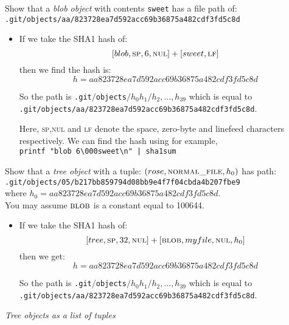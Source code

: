 \begin{example}
Show that a \textit{blob object} with contents \lstinline{sweet} has a file path of:\\
\lstinline{.git/objects/aa/823728ea7d592acc69b36875a482cdf3fd5c8d}

\begin{itemize}
\item
If we take the SHA1 hash of:
$$[blob,\textsc{sp},6,\textsc{nul}] + [sweet,\textsc{lf}]$$
then we find the hash is:
$$h = aa823728ea7d592acc69b36875a482cdf3fd5c8d$$


So the path is \lstinline{.git}$/$\lstinline{objects}$/h_0h_1/h_2,...,h_{39}$
which is equal to \lstinline{.git/objects/aa/823728ea7d592acc69b36875a482cdf3fd5c8d}.

Here, \textsc{sp},\textsc{nul} and \textsc{lf} denote 
the space, zero-byte and linefeed characters respectively. We 
can find the hash using for example,\\ \lstinline{printf "blob 6\000sweet\n" | sha1sum}
\end{itemize}

\end{example}



\frmrule 

\begin{example}
Show that a \textit{tree object} with a tuple:
$(rose,\textsc{normal\textunderscore file},h_0)$
has path:\\
\lstinline{.git/objects/05/b217bb859794d08bb9e4f7f04cbda4b207fbe9}\\
where $h_0 = aa823728ea7d592acc69b36875a482cdf3fd5c8d$.\\
You may assume $\textsc{blob}$ is a constant equal to 100644.

\begin{itemize}
\item
If we take the SHA1 hash of:
$$[tree,\textsc{sp},32,\textsc{nul}] + 
[\textsc{blob},myfile,\textsc{nul},h_0]$$
then we get:
$$h = aa823728ea7d592acc69b36875a482cdf3fd5c8d$$


So the path is \lstinline{.git}$/$\lstinline{objects}$/h_0h_1/h_2,...,h_{39}$
which is equal to \lstinline{.git/objects/aa/823728ea7d592acc69b36875a482cdf3fd5c8d}.

\end{itemize}
\end{example}

\frmrule 

\textit{Tree objects as a list of tuples}

